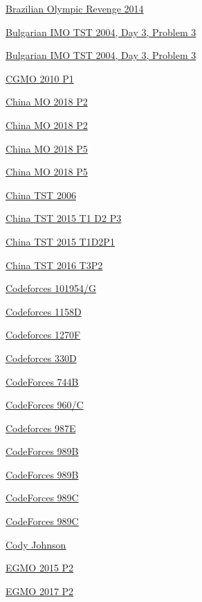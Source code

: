 \hyperref  [problem:Brazilian Olympic Revenge 2014]{Brazilian Olympic Revenge 2014}

\hyperref  [problem:Bulgarian IMO TST 2004, Day 3, Problem 3]{Bulgarian IMO TST 2004, Day 3, Problem 3}

\hyperref  [problem:Bulgarian IMO TST 2004, Day 3, Problem 3]{Bulgarian IMO TST 2004, Day 3, Problem 3}

\hyperref  [problem:CGMO 2010 P1]{CGMO 2010 P1}

\hyperref  [problem:China MO 2018 P2]{China MO 2018 P2}

\hyperref  [problem:China MO 2018 P2]{China MO 2018 P2}

\hyperref  [problem:China MO 2018 P5]{China MO 2018 P5}

\hyperref  [problem:China MO 2018 P5]{China MO 2018 P5}

\hyperref  [problem:China TST 2006]{China TST 2006}

\hyperref  [problem:China TST 2015 T1 D2 P3]{China TST 2015 T1 D2 P3}

\hyperref  [problem:China TST 2015 T1D2P1]{China TST 2015 T1D2P1}

\hyperref  [problem:China TST 2016 T3P2]{China TST 2016 T3P2}

\hyperref  [problem:Codeforces 101954/G]{Codeforces 101954/G}

\hyperref  [problem:Codeforces 1158D]{Codeforces 1158D}

\hyperref  [problem:Codeforces 1270F]{Codeforces 1270F}

\hyperref  [problem:Codeforces 330D]{Codeforces 330D}

\hyperref  [problem:CodeForces 744B]{CodeForces 744B}

\hyperref  [problem:CodeForces 960/C]{CodeForces 960/C}

\hyperref  [problem:Codeforces 987E]{Codeforces 987E}

\hyperref  [problem:CodeForces 989B]{CodeForces 989B}

\hyperref  [problem:CodeForces 989B]{CodeForces 989B}

\hyperref  [problem:CodeForces 989C]{CodeForces 989C}

\hyperref  [problem:CodeForces 989C]{CodeForces 989C}

\hyperref  [problem:Cody Johnson]{Cody Johnson}

\hyperref  [problem:EGMO 2015 P2]{EGMO 2015 P2}

\hyperref  [problem:EGMO 2017 P2]{EGMO 2017 P2}

